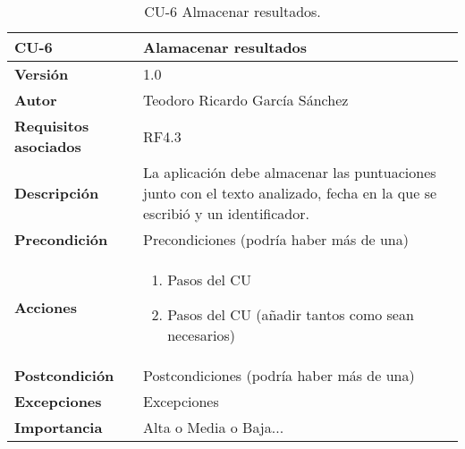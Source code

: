 \begin{table}[p]
	\centering
	\begin{tabularx}{\linewidth}{ p{} p{} }
		\toprule
		\textbf{CU-6}    & \textbf{Alamacenar resultados}\\
		\toprule
		\textbf{Versión}              & 1.0    \\
		\textbf{Autor}                & Teodoro Ricardo García Sánchez \\
		\textbf{Requisitos asociados} & RF4.3 \\
		\textbf{Descripción}          & La aplicación debe almacenar las puntuaciones junto con el texto analizado, fecha en la que se escribió y un identificador. \\
		\textbf{Precondición}         & Precondiciones (podría haber más de una) \\
		\textbf{Acciones}             &
		\begin{enumerate}
			\def\labelenumi{\arabic{enumi}.}
			\tightlist
			\item Pasos del CU
			\item Pasos del CU (añadir tantos como sean necesarios)
		\end{enumerate}\\
		\textbf{Postcondición}        & Postcondiciones (podría haber más de una) \\
		\textbf{Excepciones}          & Excepciones \\
		\textbf{Importancia}          & Alta o Media o Baja... \\
		\bottomrule
	\end{tabularx}
	\caption{CU-6 Almacenar resultados.}
\end{table}
